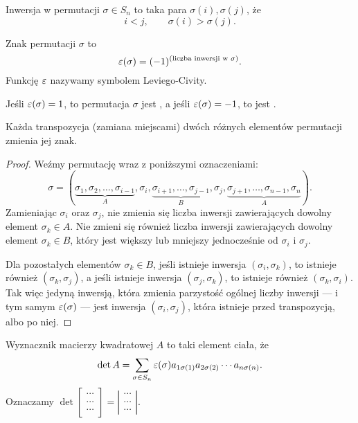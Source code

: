 \begin{definition}
    Inwersja w permutacji $\sigma \in S_n$ to taka para $\sigma(i), \sigma(j)$, że
    \[ i < j, \qquad \sigma(i) > \sigma(j). \]
\end{definition}

\begin{definition}
    Znak permutacji $\sigma$ to
    \[ \varepsilon(\sigma) = (-1)^{(\text{liczba inwersji w } \sigma)}. \]
    Funkcję $\varepsilon$ nazywamy symbolem Leviego-Civity.
\end{definition}

Jeśli $\varepsilon(\sigma) = 1$, to permutacja $\sigma$ jest , a jeśli  $\varepsilon(\sigma) = -1$, to jest .

\begin{fact}
    \label{f:sign of transposition}
    Każda transpozycja (zamiana miejscami) dwóch różnych elementów permutacji zmienia jej znak.
\end{fact}
\begin{proof}
    Weźmy permutację wraz z poniższymi oznaczeniami:
    \[ \sigma = (\underbrace{\sigma_1, \sigma_2, \ldots, \sigma_{i-1}}_A, \sigma_i, \underbrace{\sigma_{i+1}, \ldots, \sigma_{j-1}}_B, \sigma_j, \underbrace{\sigma_{j+1}, \ldots, \sigma_{n-1}, \sigma_n}_A). \]
    Zamieniając $\sigma_i$ oraz $\sigma_j$, nie zmienia się liczba inwersji zawierających dowolny element $\sigma_k \in A$. Nie zmieni się również liczba inwersji zawierających dowolny element $\sigma_k \in B$, który jest większy lub mniejszy jednocześnie od $\sigma_i$ i $\sigma_j$.

    Dla pozostałych elementów $\sigma_k \in B$, jeśli istnieje inwersja $(\sigma_i, \sigma_k)$, to istnieje również $(\sigma_k, \sigma_j)$, a jeśli istnieje inwersja $(\sigma_j, \sigma_k)$, to istnieje również $(\sigma_k, \sigma_i)$. Tak więc jedyną inwersją, która zmienia parzystość ogólnej liczby inwersji --- i tym samym $\varepsilon(\sigma)$ --- jest inwersja $(\sigma_i, \sigma_j)$, która istnieje przed transpozycją, albo po niej.
\end{proof}

\begin{definition}
    \label{d:determinant}
    Wyznacznik macierzy kwadratowej $A$ to taki element ciała, że
    \[ \det A = \sum_{\sigma\in S_n} \varepsilon(\sigma)a_{1\sigma(1)}a_{2\sigma(2)}\cdots a_{n\sigma(n)}. \]
    Oznaczamy $\det
    \left[\begin{smallmatrix}
        \cdots \\ \cdots \\ \cdots
    \end{smallmatrix}\right] =
    \left|\begin{smallmatrix}
        \cdots \\ \cdots \\ \cdots
    \end{smallmatrix}\right|$.
\end{definition}

